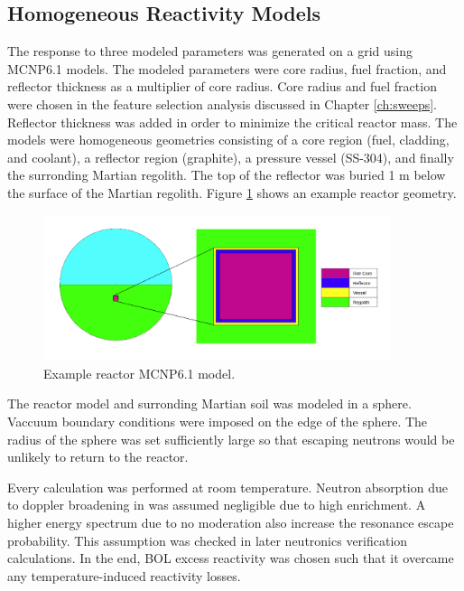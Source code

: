 \subsection{Homogeneous Reactivity Models}
The \keff response to three modeled parameters was generated on a grid using
MCNP6.1 models. The modeled parameters were core radius, fuel fraction, and
reflector thickness as a multiplier of core radius. Core radius and fuel
fraction were chosen in the feature selection analysis discussed in Chapter
\ref{ch:sweeps}. Reflector thickness was added in order to minimize the 
critical reactor mass. 
The models were homogeneous geometries consisting of
a core region (fuel, cladding, and coolant), a reflector region (graphite), a
pressure vessel (SS-304), and finally the surronding Martian regolith. The top of the
reflector was buried 1 m below the surface of the Martian regolith. Figure
\ref{fig:homog_model} shows an example reactor geometry.

\begin{figure}[h]
    \centering
    \includegraphics[width=4in]{../images/crit_model_geom.png}
\caption{Example reactor MCNP6.1 model.}
\label{fig:homog_model}
\end{figure}

The reactor model and surronding Martian soil was modeled in a sphere. Vaccuum
boundary conditions were imposed on the edge of the sphere. The radius of the
sphere was set sufficiently large so that escaping neutrons would be unlikely to
return to the reactor.

Every \keff calculation was performed at room temperature. Neutron absorption
due to doppler broadening in 
\urantwo was assumed negligible due to high enrichment. A higher energy
spectrum due to no moderation also increase the resonance escape probability.
This assumption was checked in later neutronics verification calculations. 
In the end, BOL excess reactivity was chosen such that it overcame any 
temperature-induced reactivity losses. 

